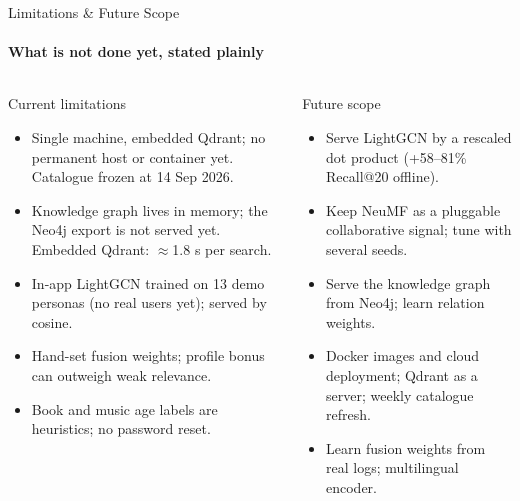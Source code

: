 \documentclass[aspectratio=169, 11pt]{beamer}
\begin{document}
\begin{frame}{Limitations \& Future Scope}
    \framesubtitle{What is not done yet, stated plainly}
    \begin{columns}[T]
        \begin{block}{Current limitations}
            \scriptsize
            \begin{itemize}
                \item Single machine, embedded Qdrant; no permanent host or container yet. Catalogue frozen at 14 Sep 2026.
                \item Knowledge graph lives in memory; the Neo4j export is not served yet. Embedded Qdrant: $\approx$1.8 s per search.
                \item In-app LightGCN trained on 13 demo personas (no real users yet); served by cosine.
                \item Hand-set fusion weights; profile bonus can outweigh weak relevance.
                \item Book and music age labels are heuristics; no password reset.
            \end{itemize}
        \end{block}
        \begin{block}{Future scope}
            \scriptsize
            \begin{itemize}
                \item Serve LightGCN by a rescaled dot product (+58--81\% Recall@20 offline).
                \item Keep NeuMF as a pluggable collaborative signal; tune with several seeds.
                \item Serve the knowledge graph from Neo4j; learn relation weights.
                \item Docker images and cloud deployment; Qdrant as a server; weekly catalogue refresh.
                \item Learn fusion weights from real logs; multilingual encoder.
            \end{itemize}
        \end{block}
    \end{columns}
\end{frame}
\end{document}
